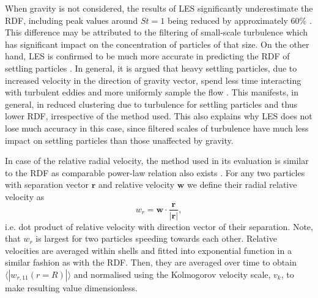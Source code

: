 \documentclass{pracamgren}
\begin{document}
When gravity is not considered, the results of LES significantly underestimate the RDF, including peak values around $St=1$ being reduced by approximately $60 \%$ \parencite{Fede2006,Yang2008,Marchioli2008}.
This difference may be attributed to the filtering of small-scale turbulence which has significant impact on the concentration of particles of that size.
On the other hand, LES is confirmed to be much more accurate in predicting the RDF of settling particles \parencite[see][]{Rosa2017}.
In general, it is argued that heavy settling particles, due to increased velocity in the direction of gravity vector, spend less time interacting with turbulent eddies and more uniformly sample the flow \parencite{Ireland2016}.
This manifests, in general, in reduced clustering due to turbulence for settling particles and thus lower RDF, irrespective of the method used.
This also explains why LES does not lose much accuracy in this case, since filtered scales of turbulence have much less impact on settling particles than those unaffected by gravity.

\smallskip

In case of the relative radial velocity, the method used in its evaluation is similar to the RDF as comparable power-law relation also exists \parencite[Equation 13 therein]{Rosa2013}.
For any two particles with separation vector $\mathbf{r}$ and relative velocity $\mathbf{w}$ we define their radial relative velocity as
\begin{equation}
w_r = \mathbf{w} \cdot \frac{\mathbf{r}}{|\mathbf{r}|} ,
\label{eqn:rrv}
\end{equation} 
i.e. dot product of relative velocity with direction vector of their separation.
Note, that $w_r$ is largest for two particles speeding towards each other.
Relative velocities are averaged within shells and fitted into exponential function in a similar fashion as with the RDF.
Then, they are averaged over time to obtain $\langle|w_{r, 11}(r = R)|\rangle$ and normalised using the Kolmogorov velocity scale, $v_k$, to make resulting value dimensionless.
\end{document}
